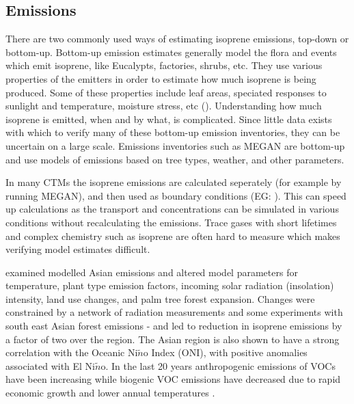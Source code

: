   
  \subsection{Emissions}
  
    There are two commonly used ways of estimating isoprene emissions, top-down or bottom-up.
    Bottom-up emission estimates generally model the flora and events which emit isoprene, like Eucalypts, factories, shrubs, etc.
    They use various properties of the emitters in order to estimate how much isoprene is being produced.
    Some of these properties include leaf areas, speciated responses to sunlight and temperature, moisture stress, etc (\cite{Guenther1995,Guenther2006}).
    Understanding how much isoprene is emitted, when and by what, is complicated.
    Since little data exists with which to verify many of these bottom-up emission inventories, they can be uncertain on a large scale.
    Emissions inventories such as MEGAN are bottom-up and use models of emissions based on tree types, weather, and other parameters.
    
    In many CTMs the isoprene emissions are calculated seperately (for example by running MEGAN), and then used as boundary conditions (EG: \cite{Guenther2006}). 
    This can speed up calculations as the transport and concentrations can be simulated in various conditions without recalculating the emissions.
    Trace gases with short lifetimes and complex chemistry such as isoprene are often hard to measure which makes verifying model estimates difficult.
    
    \cite{Stavrakou2014} examined modelled Asian emissions and altered model parameters for temperature, plant type emission factors, incoming solar radiation (insolation) intensity, land use changes, and palm tree forest expansion.
    Changes were constrained by a network of radiation measurements and some experiments with south east Asian forest emissions - and led to reduction in isoprene emissions by a factor of two over the region.
    The Asian region is also shown to have a strong correlation with the Oceanic Ni$\tilde{n}$o Index (ONI), with positive anomalies associated with El Ni$\tilde{n}$o.
    In the last 20 years anthropogenic emissions of VOCs have been increasing while biogenic VOC emissions have decreased due to rapid economic growth and lower annual temperatures \citep{Stavrakou2014, Kwon2017}.
  
